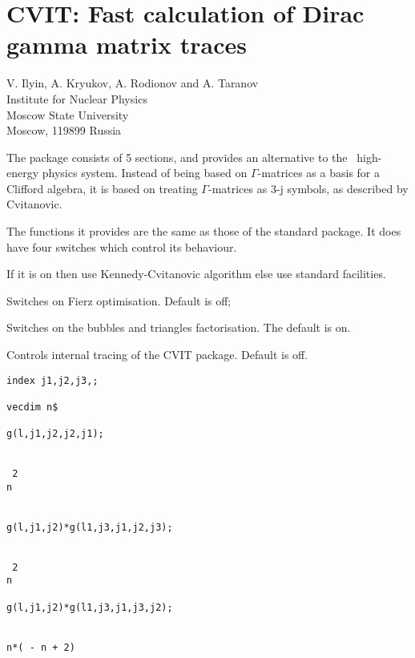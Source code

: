 \chapter[CVIT:Dirac gamma matrix traces]%
        {CVIT: Fast calculation of Dirac gamma matrix traces}
\label{CVIT}

{\footnotesize
\begin{center}
V. Ilyin, A. Kryukov, A. Rodionov and A. Taranov \\
Institute for Nuclear Physics \\
Moscow State University  \\
Moscow, 119899 Russia
\end{center}
}


The package consists of 5 sections, and provides an alternative to the
\REDUCE\ high-energy physics system.  Instead of being based on
$\Gamma$-matrices as a basis for a Clifford algebra, it is based on
treating $\Gamma$-matrices as 3-j symbols, as described by
Cvitanovic.

The functions it provides are the same as those of the standard
package.  It does have four switches which control its behaviour.


If it is on then use Kennedy-Cvitanovic algorithm else use standard
facilities.


Switches on Fierz optimisation.  Default is off;


Switches on the bubbles and triangles factorisation.  The default is
on.



Controls internal tracing of the CVIT package.  Default is off.

\begin{verbatim}
index j1,j2,j3,;

vecdim n$

g(l,j1,j2,j2,j1);


 2
n


g(l,j1,j2)*g(l1,j3,j1,j2,j3);


 2
n

g(l,j1,j2)*g(l1,j3,j1,j3,j2);


n*( - n + 2)
\end{verbatim}

